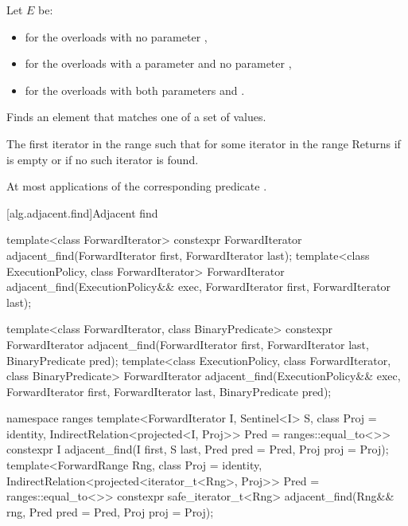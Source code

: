\begin{itemdescr}
\begin{addedblock}
\pnum
Let $E$ be:
\begin{itemize}
\item {} for the overloads with no parameter ,
\item {} for the overloads with a parameter  and no parameter ,
\item {} for the overloads with both parameters  and .
\end{itemize}
\end{addedblock}

\pnum
\effects
Finds an element that matches one of a set of values.

\pnum
\returns
The first iterator
in the range 
such that for some
iterator
in the range  
Returns 
if  is empty or
if no such iterator is found.

\pnum
\complexity
At most
applications of the corresponding predicate .
\end{itemdescr}

[alg.adjacent.find]{Adjacent find}

%
\begin{itemdecl}
template<class ForwardIterator>
  constexpr ForwardIterator
    adjacent_find(ForwardIterator first, ForwardIterator last);
template<class ExecutionPolicy, class ForwardIterator>
  ForwardIterator
    adjacent_find(ExecutionPolicy&& exec,
                  ForwardIterator first, ForwardIterator last);

template<class ForwardIterator, class BinaryPredicate>
  constexpr ForwardIterator
    adjacent_find(ForwardIterator first, ForwardIterator last,
                  BinaryPredicate pred);
template<class ExecutionPolicy, class ForwardIterator, class BinaryPredicate>
  ForwardIterator
    adjacent_find(ExecutionPolicy&& exec,
                  ForwardIterator first, ForwardIterator last,
                  BinaryPredicate pred);
\end{itemdecl}
\begin{addedblock}
\begin{itemdecl}
namespace ranges {
  template<ForwardIterator I, Sentinel<I> S, class Proj = identity,
      IndirectRelation<projected<I, Proj>> Pred = ranges::equal_to<>>
    constexpr I adjacent_find(I first, S last, Pred pred = Pred{},
                              Proj proj = Proj{});
  template<ForwardRange Rng, class Proj = identity,
      IndirectRelation<projected<iterator_t<Rng>, Proj>> Pred = ranges::equal_to<>>
    constexpr safe_iterator_t<Rng>
      adjacent_find(Rng&& rng, Pred pred = Pred{}, Proj proj = Proj{});
}
\end{itemdecl}
\end{addedblock}

